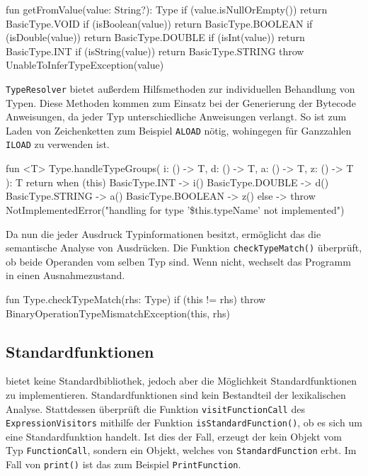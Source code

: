 \begin{KotlinCode}[numbers=none, caption={Methode zur Ermittlung des Typs bei Wert-Literalen}, label={lst:getFromValue}]
fun getFromValue(value: String?): Type {
    if (value.isNullOrEmpty()) return BasicType.VOID
    if (isBoolean(value)) return BasicType.BOOLEAN
    if (isDouble(value)) return BasicType.DOUBLE
    if (isInt(value)) return BasicType.INT
    if (isString(value)) return BasicType.STRING
    throw UnableToInferTypeException(value)
}
\end{KotlinCode}

\texttt{TypeResolver} bietet außerdem Hilfsmethoden zur individuellen Behandlung von Typen. Diese Methoden kommen zum Einsatz bei der Generierung der Bytecode Anweisungen, da jeder Typ unterschiedliche Anweisungen verlangt. So ist zum Laden von Zeichenketten zum Beispiel \texttt{ALOAD} nötig, wohingegen für Ganzzahlen \texttt{ILOAD} zu verwenden ist.

\begin{KotlinCode}[numbers=none, caption={Hilfsmethode zur Behandlung der Nicht-Feld Typen}]
fun <T> Type.handleTypeGroups(
    i: () -> T,
    d: () -> T,
    a: () -> T,
    z: () -> T
): T {
    return when (this) {
        BasicType.INT -> i()
        BasicType.DOUBLE -> d()
        BasicType.STRING -> a()
        BasicType.BOOLEAN -> z()
        else -> throw NotImplementedError("handling for type '\${this.typeName}' not implemented")
    }
}
\end{KotlinCode}

Da nun die jeder Ausdruck Typinformationen besitzt, ermöglicht das die semantische Analyse von Ausdrücken. Die Funktion \texttt{checkTypeMatch()} überprüft, ob beide Operanden vom selben Typ sind. Wenn nicht, wechselt das Programm in einen Ausnahmezustand.

\begin{KotlinCode}[numbers=none, caption={Methode zur Überprüfung, dass Operanden übereinstimmende Typen haben}]
fun Type.checkTypeMatch(rhs: Type) {
    if (this != rhs) throw BinaryOperationTypeMismatchException(this, rhs)
}    
\end{KotlinCode}

\subsection{Standardfunktionen}

\Toya bietet keine Standardbibliothek, jedoch aber die Möglichkeit Standardfunktionen zu implementieren. Standardfunktionen sind kein Bestandteil der lexikalischen Analyse. Stattdessen überprüft die Funktion \texttt{visitFunctionCall} des \texttt{ExpressionVisitors} mithilfe der Funktion \texttt{isStandardFunction()}, ob es sich um eine Standardfunktion handelt. Ist dies der Fall, erzeugt der \visitor kein Objekt vom Typ \texttt{FunctionCall}, sondern ein Objekt, welches von \texttt{StandardFunction} erbt. Im Fall von \texttt{print()} ist das zum Beispiel \texttt{PrintFunction}.

